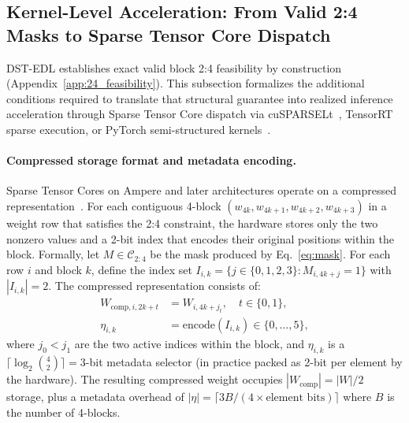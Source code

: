 
\subsection{Kernel-Level Acceleration: From Valid 2:4 Masks to Sparse Tensor Core Dispatch}
\label{app:kernel_acceleration}

DST-EDL establishes exact valid block 2:4 feasibility by construction
(Appendix~\ref{app:24_feasibility}). This subsection formalizes the
additional conditions required to translate that structural guarantee into
realized inference acceleration through Sparse Tensor Core dispatch via
cuSPARSELt~\cite{nvidiacusparselt}, TensorRT sparse execution, or PyTorch
semi-structured kernels~\cite{pytorchsemistructured}.

\paragraph{Compressed storage format and metadata encoding.}
Sparse Tensor Cores on Ampere and later architectures operate on a compressed
representation~\cite{mishra2021accelerating}. For each contiguous 4-block
$(w_{4k},w_{4k+1},w_{4k+2},w_{4k+3})$ in a weight row that satisfies the 2:4
constraint, the hardware stores only the two nonzero values and a 2-bit index
that encodes their original positions within the block. Formally, let
$M\in\mathcal{C}_{2:4}$ be the mask produced by Eq.~\ref{eq:mask}. For each
row $i$ and block $k$, define the index set
$I_{i,k}=\{j\in\{0,1,2,3\}:M_{i,4k+j}=1\}$ with $|I_{i,k}|=2$. The
compressed representation consists of:
\begin{equation}\label{eq:compressed_format}
\begin{aligned}
    W_{\mathrm{comp},i,2k+t} &= W_{i,4k+j_t},\quad t\in\{0,1\},\\
    \eta_{i,k} &= \mathrm{encode}(I_{i,k})\in\{0,\ldots,5\},
\end{aligned}
\end{equation}
where $j_0<j_1$ are the two active indices within the block, and
$\eta_{i,k}$ is a $\lceil\log_2\binom{4}{2}\rceil=3$-bit metadata selector
(in practice packed as 2-bit per element by the hardware). The resulting
compressed weight occupies $|W_{\mathrm{comp}}|=|W|/2$ storage, plus a
metadata overhead of $|\eta|=\lceil 3B/(4\times\text{element bits})\rceil$
where $B$ is the number of 4-blocks.

